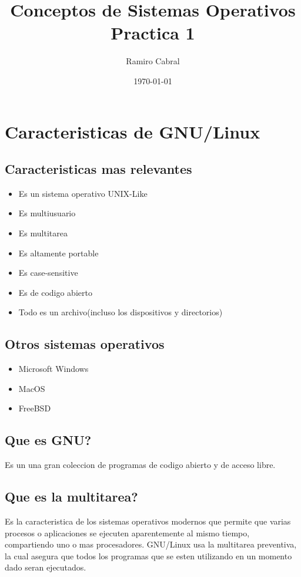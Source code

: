 \documentclass[11pt]{article}
\title{\Huge{Conceptos de Sistemas Operativos\\
Practica 1}}
\author{\huge{Ramiro Cabral}}
\date{\today}
\begin{document}
\maketitle
\pagebreak
\section{Caracteristicas de GNU/Linux}

\subsection{Caracteristicas mas relevantes}
\begin{itemize}
    \item Es un sistema operativo UNIX-Like
    \item Es multiusuario
    \item Es multitarea
    \item Es altamente portable
    \item Es case-sensitive
    \item Es de codigo abierto
    \item Todo es un archivo(incluso los dispositivos y directorios)
\end{itemize}

\subsection{Otros sistemas operativos}
\begin{itemize}
    \item Microsoft Windows
    \item MacOS
    \item FreeBSD
\end{itemize}

\subsection{Que es GNU?}
Es un una gran coleccion de programas de codigo abierto y de acceso libre.

\subsection{Que es la multitarea?}
Es la caracteristica de los sistemas operativos modernos que permite que varias procesos o aplicaciones se ejecuten aparentemente al mismo tiempo, compartiendo uno o mas procesadores. GNU/Linux usa la multitarea preventiva, la cual asegura que todos los programas que se esten utilizando en un momento dado seran ejecutados.
\end{document}
